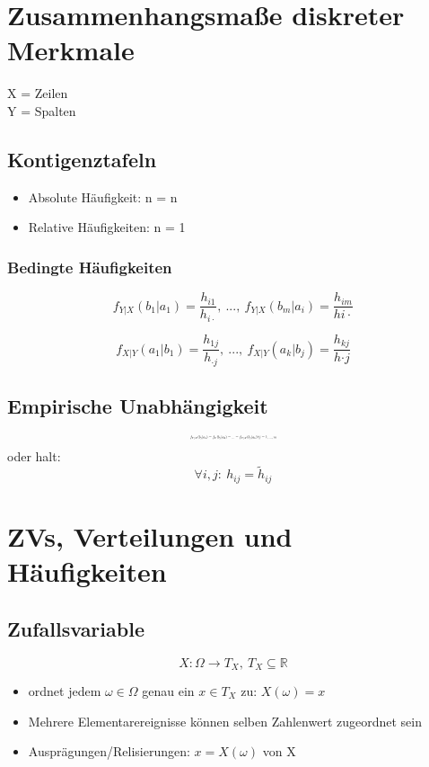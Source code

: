 \documentclass[10pt,a4paper,landscape]{article}
\begin{document}
\begin{multicols}{4}
\section{Zusammenhangsmaße diskreter Merkmale}
X = Zeilen \\
Y = Spalten
\subsection{Kontigenztafeln}
\begin{itemize}
\item Absolute Häufigkeit: n = n
\item Relative Häufigkeiten: n = 1
\end{itemize}

\subsubsection*{Bedingte Häufigkeiten}

\[
f_{Y|X}(b_1|a_1)=\frac{h_{i1}}{h_{i\cdot}},~...,~ f_{Y|X}(b_m|a_i)=\frac{h_{im}}{h{i\cdot}}
\]

\[
f_{X|Y}(a_1|b_1)=\frac{h_{1j}}{h_{\cdot j}},~...,~ f_{X|Y}(a_k|b_j)=\frac{h_{kj}}{h{\cdot j}}
\]

\subsection{Empirische Unabhängigkeit}
\[ \resizebox{0.2\textwidth}{!}{$
f_{Y|X}(b_j|a_1)=f_Y(b_j|a_2)=...=f_{Y|X}(b_j|a_k)\forall j=1,...,m
$}
\]
oder halt:
\[
\forall i,j: ~ h_{ij}=\tilde{h}_{ij}
\]


\section{ZVs, Verteilungen und Häufigkeiten}

\subsection{Zufallsvariable}
\[
X:\Omega \rightarrow T_X , ~ T_X\subseteq \mathbb{R}
\]

\begin{itemize}
\item ordnet jedem $\omega \in \Omega$ genau ein $x \in T_X$ zu: $X(\omega)=x$
\item Mehrere Elementarereignisse können selben Zahlenwert zugeordnet sein
\item Ausprägungen/Relisierungen: $x=X(\omega)$ von X
\end{itemize}


\end{multicols}
\end{document}

